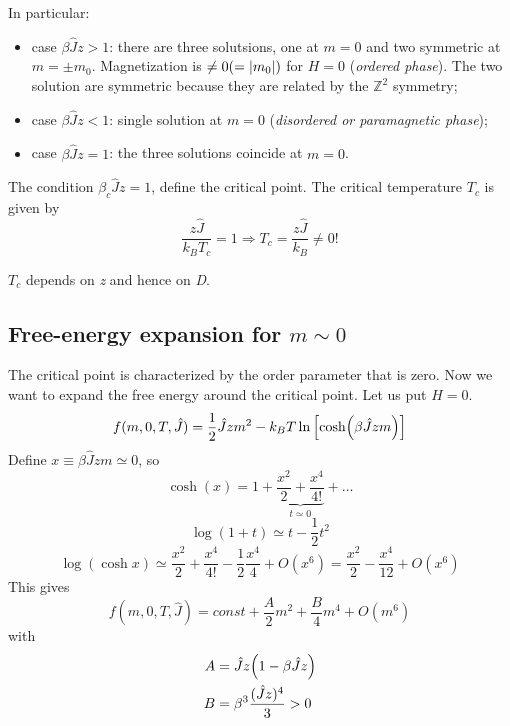 \documentclass[../main/main.tex]{subfiles}
\begin{document}
In particular:
\begin{itemize}
\item case \( \beta \hat{J} z > 1  \): there are three solutsions, one at \( m=0 \) and two symmetric at \( m=\pm m_0 \). Magnetization is \( \neq 0 (= \abs{m_0} )\) for \( H=0 \) (\emph{ordered phase}).  The two solution are symmetric because they are related by the \( \mathbb{Z}^2 \)  symmetry;
\item case \( \beta \hat{J} z < 1  \): single solution at \( m=0 \) (\emph{disordered or paramagnetic phase});
\item case \( \beta \hat{J} z = 1  \): the three solutions coincide at \( m=0 \).
\end{itemize}
The condition \( \beta_c \hat{J} z = 1  \), define the critical point. The critical temperature \( T_c \) is given by
\begin{equation}
  \frac{z \hat{J} }{k_B T_c} = 1 \Rightarrow T_c = \frac{z \hat{J} }{k_B} \neq 0!
\end{equation}
\begin{remark}
\( T_c \) depends on \emph{z} and hence on \emph{D}.
\end{remark}

\subsection{Free-energy expansion for \( m \sim 0 \)}
The critical point is characterized by the order parameter that is zero. Now we want to expand the free energy around the critical point. Let us put \( H=0 \).
\begin{equation}
  f(m,0,T,\hat{J} ) = \frac{1}{2}\hat{J}zm^2 -k_BT \ln{\qty[\cosh(\beta \hat{J}zm )]}
\end{equation}
Define \( x \equiv \beta \hat{J} z m \simeq 0  \), so
\begin{equation}
  \cosh (x) = 1 + \underbrace{\frac{x^2}{2} + \frac{x^4}{4!}}_{t \simeq 0}  + \dots
\end{equation}
\begin{equation}
  \log{(1+t)} \simeq t - \frac{1}{2}t^2
\end{equation}
\begin{equation}
  \log{(\cosh x)} \simeq \frac{x^2}{2} + \frac{x^4}{4!} - \frac{1}{2} \frac{x^4}{4}+O(x^6)
  = \frac{x^2}{2} - \frac{x^4}{12}+O(x^6)
\end{equation}
This gives
\begin{equation}
  f(m,0,T,\hat{J} ) = const + \frac{A}{2} m^2 + \frac{B}{4} m^4 + O (m^6)
\end{equation}
with
\begin{subequations}
\begin{align}
   A &= \hat{J} z \qty(1- \beta \hat{J} z) \\
    B &= \beta ^3 \frac{(\hat{J}z )^4}{3} > 0
\end{align}
\end{subequations}
\end{document}
